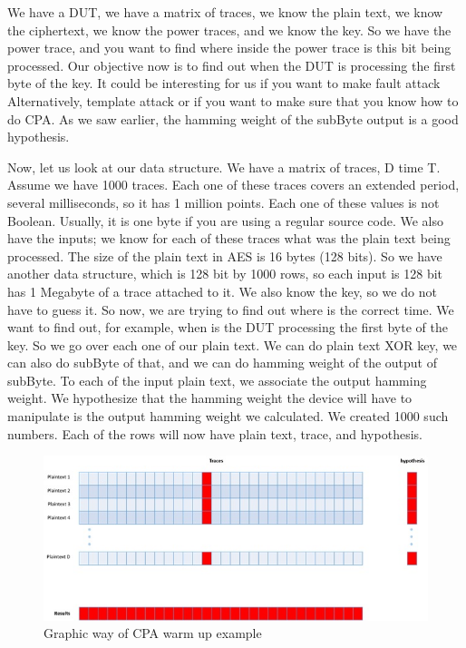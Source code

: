 We have a DUT, we have a matrix of traces, we know the plain text, we know the
ciphertext, we know the power traces, and we know the key. So we have the power
trace, and you want to find where inside the power trace is this bit being
processed. Our objective now is to find out when the DUT is processing the first
byte of the key. It could be interesting for us if you want to make fault attack \cite{FaultAttack}
Alternatively, template attack \cite{TemplateAttack} or if you want to make sure that you know how to do CPA.
As we saw earlier, the hamming weight of the subByte output is a good
hypothesis.

Now, let us look at our data structure. We have a matrix of traces, D time T.
Assume we have 1000 traces. Each one of these traces covers an extended period, several milliseconds, so it has 1 million points. Each one of these values
is not Boolean. Usually, it is one byte if you are using a regular source code. We
also have the inputs; we know for each of these traces what was the plain
text being processed. The size of the plain text in AES is 16 bytes (128 bits).
So we have another data structure, which is 128 bit by 1000 rows, so each input
is 128 bit has 1 Megabyte of a trace attached to it. We also know the key, so we
do not have to guess it. So now, we are trying to find out where is the correct
time. We want to find out, for example, when is the DUT processing the first byte
of the key. So we go over each one of our plain text. We can do plain text XOR
key, we can also do subByte of that, and we can do hamming weight of the output
of subByte. To each of the input plain text, we associate the output hamming
weight. We hypothesize that the hamming weight the device will have to
manipulate is the output hamming weight we calculated. We created 1000 such
numbers. Each of the rows will now have plain text, trace, and hypothesis.

\begin{figure}[!ht]
    \centering
    \includegraphics[width=1.0\textwidth]{images/chapter8/cpa_warmup_example.jpg}
    \caption{Graphic way of CPA warm up example} \label{c8_cpa_warmup_example:fig}
\end{figure}


